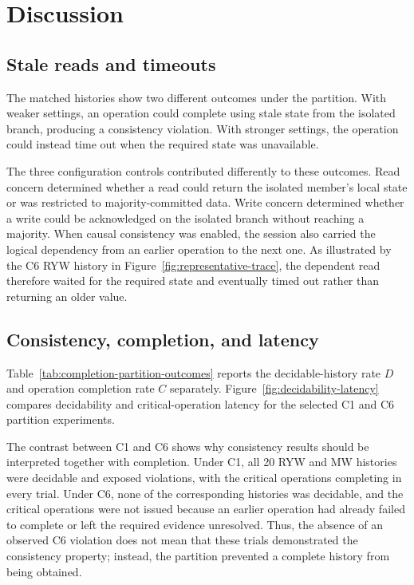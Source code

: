 \section{Discussion}

\subsection{Stale reads and timeouts}

The matched histories show two different outcomes under the partition. With
weaker settings, an operation could complete using stale state from the
isolated branch, producing a consistency violation. With stronger settings,
the operation could instead time out when the required state was unavailable.

The three configuration controls contributed differently to these outcomes.
Read concern determined whether a read could return the isolated member's
local state or was restricted to majority-committed data. Write concern
determined whether a write could be acknowledged on the isolated branch
without reaching a majority. When causal consistency was enabled, the session
also carried the logical dependency from an earlier operation to the next one.
As illustrated by the C6 RYW history in
Figure~\ref{fig:representative-trace}, the dependent read therefore waited for
the required state and eventually timed out rather than returning an older
value.

\subsection{Consistency, completion, and latency}

Table~\ref{tab:completion-partition-outcomes} reports the decidable-history
rate $D$ and operation completion rate $C$ separately.
Figure~\ref{fig:decidability-latency} compares decidability and
critical-operation latency for the selected C1 and C6 partition experiments.



The contrast between C1 and C6 shows why consistency results should be
interpreted together with completion. Under C1, all 20 RYW and MW histories
were decidable and exposed violations, with the critical operations completing
in every trial. Under C6, none of the corresponding histories was decidable,
and the critical operations were not issued because an earlier operation had
already failed to complete or left the required evidence unresolved. Thus, the
absence of an observed C6 violation does not mean that these trials demonstrated
the consistency property; instead, the partition prevented a complete history
from being obtained.

